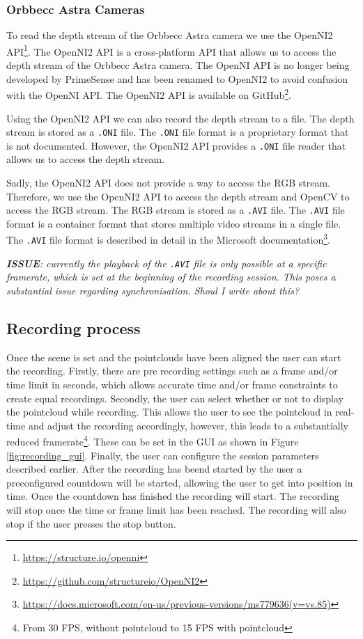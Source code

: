 \subsubsection{Orbbecc Astra Cameras}

To read the depth stream of the Orbbecc Astra camera we use the OpenNI2 API\footnote{\url{https://structure.io/openni}}. The OpenNI2 API is a cross-platform API that allows us to access the depth stream of the Orbbecc Astra camera. The OpenNI API is no longer being developed by PrimeSense and has been renamed to OpenNI2 to avoid confusion with the OpenNI API. The OpenNI2 API is available on GitHub\footnote{\url{https://github.com/structureio/OpenNI2}}.

Using the OpenNI2 API we can also record the depth stream to a file. The depth stream is stored as a \texttt{.ONI} file. The \texttt{.ONI} file format is a proprietary format that is not documented. However, the OpenNI2 API provides a \texttt{.ONI} file reader that allows us to access the depth stream.

Sadly, the OpenNI2 API does not provide a way to access the RGB stream. Therefore, we use the OpenNI2 API to access the depth stream and OpenCV to access the RGB stream. The RGB stream is stored as a \texttt{.AVI} file. The \texttt{.AVI} file format is a container format that stores multiple video streams in a single file. The \texttt{.AVI} file format is described in detail in the Microsoft documentation\footnote{\url{https://docs.microsoft.com/en-us/previous-versions/ms779636(v=vs.85)}}. 

\textit{
  \textbf{ISSUE}: currently the playback of the \texttt{.AVI} file is only possible at a specific framerate, which is set at the beginning of the recording session. This poses a substantial issue regarding synchronisation. Shoul I write about this?
}

\subsection{Recording process}

Once the scene is set and the pointclouds have been aligned the user can start the recording. Firstly, there are pre recording settings such as a frame and/or time limit in seconds, which allows accurate time and/or frame constraints to create equal recordings. Secondly, the user can select whether or not to display the pointcloud while recording. This allows the user to see the pointcloud in real-time and adjust the recording accordingly, however, this leads to a substantially reduced framerate\footnote{From 30 FPS, without pointcloud to 15 FPS with pointcloud}. These can be set in the GUI as shown in Figure \ref{fig:recording_gui}. Finally, the user can configure the session parameters described earlier. After the recording has beend started by the user a preconfigured countdown will be started, allowing the user to get into position in time. Once the countdown has finished the recording will start. The recording will stop once the time or frame limit has been reached. The recording will also stop if the user presses the stop button.  

